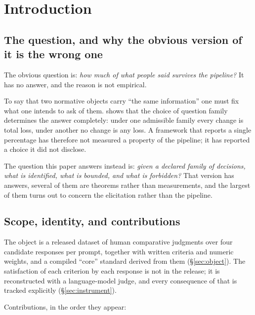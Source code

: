 {\small\tableofcontents}
\vspace{0.6em}

\section{Introduction}

\subsection{The question, and why the obvious version of it is the wrong one}

The obvious question is: \emph{how much of what people said survives the
pipeline?} It has no answer, and the reason is not empirical.

To say that two normative objects carry ``the same information'' one must fix
what one intends to ask of them.  shows that the choice of question
family determines the answer completely: under one admissible family every change
is total loss, under another no change is any loss. A framework that reports a
single percentage has therefore not measured a property of the pipeline; it has
reported a choice it did not disclose.

The question this paper answers instead is: \emph{given a declared family of
decisions, what is identified, what is bounded, and what is forbidden?} That
version has answers, several of them are theorems rather than measurements, and
the largest of them turns out to concern the elicitation rather than the
pipeline.

\subsection{Scope, identity, and contributions}

The object is a released dataset of human comparative judgments over four
candidate responses per prompt, together with written criteria and numeric
weights, and a compiled ``core'' standard derived from them (§\ref{sec:object}).
The satisfaction of each criterion by each response is not in the release; it is
reconstructed with a language-model judge, and every consequence of that is
tracked explicitly (§\ref{sec:instrument}).

Contributions, in the order they appear:

